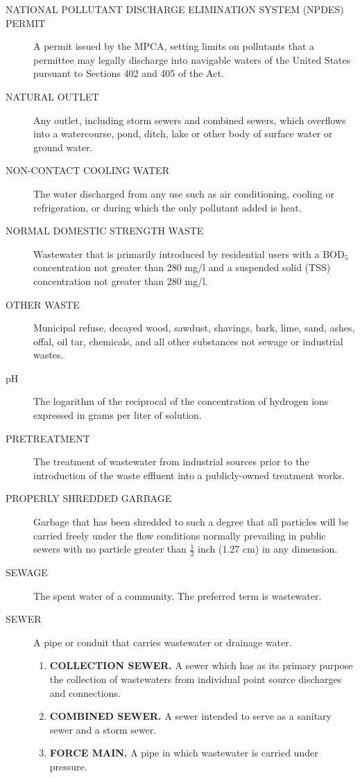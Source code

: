 \documentclass[code.tex]{subfiles}
\begin{document}
\begin{description}
\item[NATIONAL POLLUTANT DISCHARGE ELIMINATION SYSTEM (NPDES) PERMIT] A permit issued by the MPCA, setting limits on pollutants that a permittee may legally discharge into navigable waters of the United States pursuant to Sections 402 and 405 of the Act.
\item[NATURAL OUTLET] Any outlet, including storm sewers and combined sewers, which overflows into a watercourse, pond, ditch, lake or other body of surface water or ground water.
\item[NON-CONTACT COOLING WATER] The water discharged from any use such as air conditioning, cooling or refrigeration, or during which the only pollutant added is heat.
\item[NORMAL DOMESTIC STRENGTH WASTE] Wastewater that is primarily introduced by residential users with a BOD$_{5}$ concentration not greater than 280 mg/l and a suspended solid (TSS) concentration not greater than 280 mg/l.
\item[OTHER WASTE] Municipal refuse, decayed wood, sawdust, shavings, bark, lime, sand, ashes, offal, oil tar, chemicals, and all other substances not sewage or industrial wastes.
\item[pH] The logarithm of the reciprocal of the concentration of hydrogen ions expressed in grams per liter of solution.
\item[PRETREATMENT] The treatment of wastewater from industrial sources prior to the introduction of the waste effluent into a publicly-owned treatment works.
\item[PROPERLY SHREDDED GARBAGE] Garbage that has been shredded to such a degree that all particles will be carried freely under the flow conditions normally prevailing in public sewers with no particle greater than $\frac{1}{2}$ inch (1.27 cm) in any dimension.
\item[SEWAGE] The spent water of a community.  The preferred term is wastewater.
\item[SEWER] A pipe or conduit that carries wastewater or drainage water.
\begin{enumerate}
\item \textbf{COLLECTION SEWER.} A sewer which has as its primary purpose the collection of wastewaters from individual point source discharges and connections.
\item \textbf{COMBINED SEWER.} A sewer intended to serve as a sanitary sewer and a storm sewer.
\item \textbf{FORCE MAIN.} A pipe in which wastewater is carried under pressure.

\end{enumerate}
\end{description}
\end{document}
